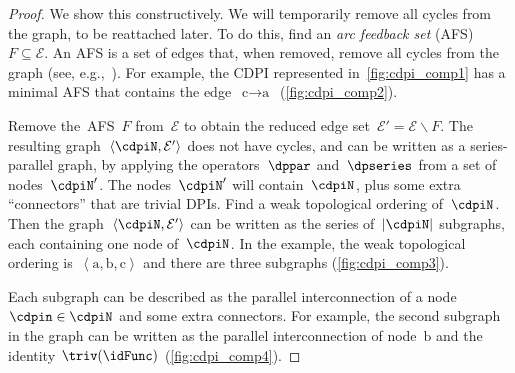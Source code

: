 \begin{proof}
We show this constructively. We will temporarily remove all cycles
from the graph, to be reattached later. To do this, find an \emph{arc
feedback set} (AFS) $F\subseteq\mathcal{E}$. An AFS is a set of edges
that, when removed, remove all cycles from the graph (see, e.g.,~\cite{golovach15incremental}).
For example, the CDPI represented in~\cref{fig:cdpi_comp1} has a minimal
AFS that contains the edge~$\text{c}\rightarrow\text{a}$~(\cref{fig:cdpi_comp2}). 


Remove the~AFS~$F$ from~$\mathcal{E}$ to obtain the reduced edge
set~$\mathcal{E}'=\mathcal{E}\backslash F$.  The resulting graph~$\left\langle \cdpiN,\mathcal{E}'\right\rangle $
does not have cycles, and can be written as a series-parallel graph,
by applying the operators~$\dppar$ and~$\dpseries$ from a set
of nodes~$\cdpiN'$. The nodes~$\cdpiN'$ will contain~$\cdpiN$,
plus some extra ``connectors'' that are trivial DPIs. Find a weak
topological ordering of~$\cdpiN$. Then the graph~$\left\langle \cdpiN,\mathcal{E}'\right\rangle $
can be written as the series of~$|\cdpiN|$ subgraphs, each containing
one node of~$\cdpiN$. In the example, the weak topological ordering
is~$\left\langle \text{a},\text{b},\text{c}\right\rangle $ and there
are three subgraphs (\cref{fig:cdpi_comp3}). 


\noindent Each subgraph can be described as the parallel interconnection
of a node~$\cdpin\in\cdpiN$ and some extra connectors. For example,
the second subgraph in the graph can be written as the parallel interconnection
of node~$\text{b}$ and the identity $\triv(\idFunc)$ (\cref{fig:cdpi_comp4}).



\end{proof}

